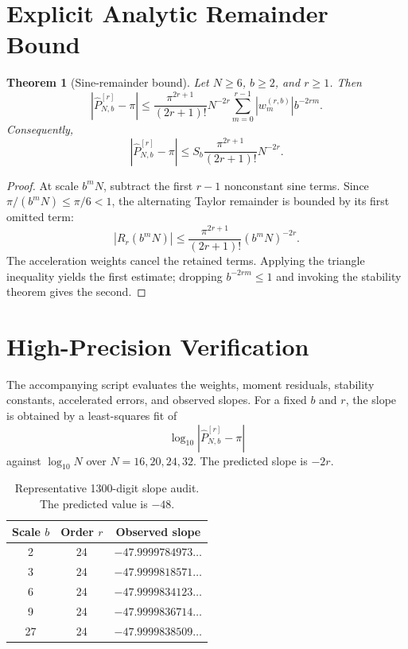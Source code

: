 \documentclass[11pt]{article}
\newtheorem{theorem}{Theorem}[section]
\theoremstyle{remark}
\newcommand{\Pacc}{\widehat P}
\begin{document}
\section{Explicit Analytic Remainder Bound}

\begin{theorem}[Sine-remainder bound]
Let $N\ge6$, $b\ge2$, and $r\ge1$.  Then
\[
  \left|\Pacc^{[r]}_{N,b}-\pi\right|
  \le
  \frac{\pi^{2r+1}}{(2r+1)!}N^{-2r}
  \sum_{m=0}^{r-1}|w_m^{(r,b)}|b^{-2rm}.
\]
Consequently,
\[
  \left|\Pacc^{[r]}_{N,b}-\pi\right|
  \le
  S_b\frac{\pi^{2r+1}}{(2r+1)!}N^{-2r}.
\]
\end{theorem}

\begin{proof}
At scale $b^mN$, subtract the first $r-1$ nonconstant sine terms.  Since
$\pi/(b^mN)\le\pi/6<1$, the alternating Taylor remainder is bounded by its
first omitted term:
\[
  |R_r(b^mN)|
  \le\frac{\pi^{2r+1}}{(2r+1)!}(b^mN)^{-2r}.
\]
The acceleration weights cancel the retained terms.  Applying the triangle
inequality yields the first estimate; dropping $b^{-2rm}\le1$ and invoking
the stability theorem gives the second.
\end{proof}

\section{High-Precision Verification}

The accompanying script evaluates the weights, moment residuals, stability
constants, accelerated errors, and observed slopes.  For a fixed $b$ and $r$,
the slope is obtained by a least-squares fit of
\[
  \log_{10}|\Pacc^{[r]}_{N,b}-\pi|
\]
against $\log_{10}N$ over $N=16,20,24,32$.  The predicted slope is $-2r$.

\begin{table}[ht]
\centering
\begin{tabular}{ccc}
\toprule
Scale $b$ & Order $r$ & Observed slope\\
\midrule
2  & 24 & $-47.9999784973\ldots$\\
3  & 24 & $-47.9999818571\ldots$\\
6  & 24 & $-47.9999834123\ldots$\\
9  & 24 & $-47.9999836714\ldots$\\
27 & 24 & $-47.9999838509\ldots$\\
\bottomrule
\end{tabular}
\caption{Representative 1300-digit slope audit.  The predicted value is
$-48$.}
\label{tab:slopes}
\end{table}
\end{document}
